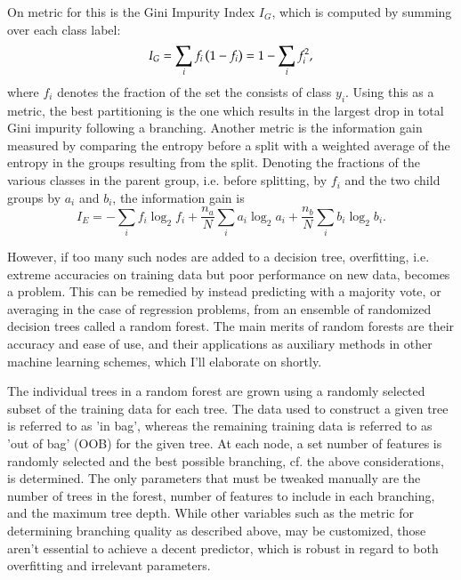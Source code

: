 On metric for this is the Gini Impurity Index $I_G$, which is computed by summing over each class label:
\begin{equation}
	I_G = \sum_i f_i \left( 1-f_i \right) = 1 - \sum_i f_i^2,
\end{equation}
where $f_i$ denotes the fraction of the set the consists of class $y_i$. Using this as a metric, the best partitioning is the one which results in the largest drop in total Gini impurity following a branching.
Another metric is the information gain measured by comparing the entropy before a split with a weighted average of the entropy in the groups resulting from the split. Denoting the fractions of the various classes in the parent group, i.e. before splitting, by $f_i$ and the two child groups by $a_i$ and $b_i$, the information gain is
\begin{equation}
	I_E = -\sum_i f_i \log_2 f_i + \frac{n_a}{N} \sum_i a_i \log_2 a_i + \frac{n_b}{N} \sum_i b_i \log_2 b_i.
\end{equation}

However, if too many such nodes are added to a decision tree, overfitting, i.e. extreme accuracies on training data but poor performance on new data, becomes a problem. This can be remedied by instead predicting with a majority vote, or averaging in the case of regression problems, from an ensemble of randomized decision trees called a random forest. The main merits of random forests are their accuracy and ease of use, and their applications as auxiliary methods in other machine learning schemes, which I'll elaborate on shortly.

The individual trees in a random forest are grown using a randomly selected subset of the training data for each tree. The data used to construct a given tree is referred to as 'in bag', whereas the remaining training data is referred to as 'out of bag' (OOB) for the given tree. At each node, a set number of features is randomly selected and the best possible branching, cf. the above considerations, is determined. The only parameters that must be tweaked manually are the number of trees in the forest, number of features to include in each branching, and the maximum tree depth. While other variables such as the metric for determining branching quality as described above, may be customized, those aren't essential to achieve a decent predictor, which is robust in regard to both overfitting and irrelevant parameters.\cite{Breiman2001}

